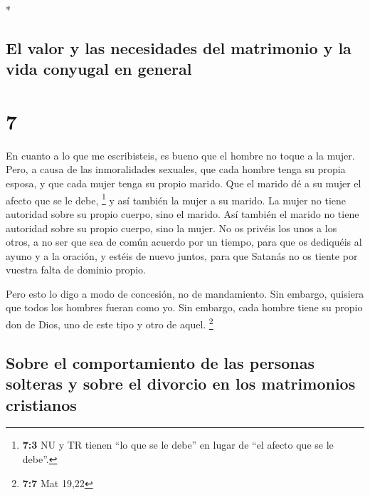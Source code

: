 \begin{paracol}{2}
\begin{otherlanguage}{english}
\end{otherlanguage}

\switchcolumn[0]*

\hypertarget{el-valor-y-las-necesidades-del-matrimonio-y-la-vida-conyugal-en-general}{%
\subsection{El valor y las necesidades del matrimonio y la vida conyugal
en
general}\label{el-valor-y-las-necesidades-del-matrimonio-y-la-vida-conyugal-en-general}}

\hypertarget{section-12}{%
\section{7}\label{section-12}}

 En cuanto a lo que me escribisteis, es bueno que el
hombre no toque a la mujer.  Pero, a causa de las
inmoralidades sexuales, que cada hombre tenga su propia esposa, y que
cada mujer tenga su propio marido.  Que el marido dé a su
mujer el afecto que se le debe, \footnote{\textbf{7:3} NU y TR tienen
  ``lo que se le debe'' en lugar de ``el afecto que se le debe''.} y así
también la mujer a su marido.  La mujer no tiene autoridad
sobre su propio cuerpo, sino el marido. Así también el marido no tiene
autoridad sobre su propio cuerpo, sino la mujer.  No os
privéis los unos a los otros, a no ser que sea de común acuerdo por un
tiempo, para que os dediquéis al ayuno y a la oración, y estéis de nuevo
juntos, para que Satanás no os tiente por vuestra falta de dominio
propio.

 Pero esto lo digo a modo de concesión, no de mandamiento.
 Sin embargo, quisiera que todos los hombres fueran como
yo. Sin embargo, cada hombre tiene su propio don de Dios, uno de este
tipo y otro de aquel. \footnote{\textbf{7:7} Mat 19,22}

\hypertarget{sobre-el-comportamiento-de-las-personas-solteras-y-sobre-el-divorcio-en-los-matrimonios-cristianos}{%
\subsection{Sobre el comportamiento de las personas solteras y sobre el
divorcio en los matrimonios
cristianos}\label{sobre-el-comportamiento-de-las-personas-solteras-y-sobre-el-divorcio-en-los-matrimonios-cristianos}}


\end{paracol}
